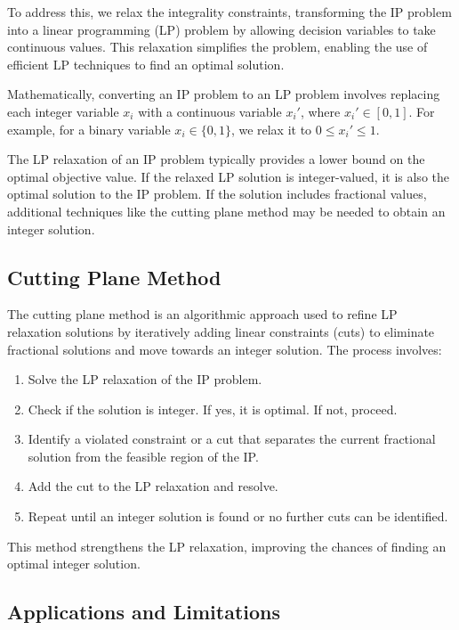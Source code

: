 \documentclass[12pt]{book} %
\begin{document}
To address this, we relax the integrality constraints, transforming the IP problem into a linear programming (LP) problem by allowing decision variables to take continuous values. This relaxation simplifies the problem, enabling the use of efficient LP techniques to find an optimal solution.

Mathematically, converting an IP problem to an LP problem involves replacing each integer variable \(x_i\) with a continuous variable \(x_i'\), where \(x_i' \in [0, 1]\). For example, for a binary variable \(x_i \in \{0, 1\}\), we relax it to \(0 \leq x_i' \leq 1\).

The LP relaxation of an IP problem typically provides a lower bound on the optimal objective value. If the relaxed LP solution is integer-valued, it is also the optimal solution to the IP problem. If the solution includes fractional values, additional techniques like the cutting plane method may be needed to obtain an integer solution.

\subsection{Cutting Plane Method}

The cutting plane method is an algorithmic approach used to refine LP relaxation solutions by iteratively adding linear constraints (cuts) to eliminate fractional solutions and move towards an integer solution. The process involves:

\begin{enumerate}
    \item Solve the LP relaxation of the IP problem.
    \item Check if the solution is integer. If yes, it is optimal. If not, proceed.
    \item Identify a violated constraint or a cut that separates the current fractional solution from the feasible region of the IP.
    \item Add the cut to the LP relaxation and resolve.
    \item Repeat until an integer solution is found or no further cuts can be identified.
\end{enumerate}

This method strengthens the LP relaxation, improving the chances of finding an optimal integer solution.

\subsection{Applications and Limitations}
\end{document}
